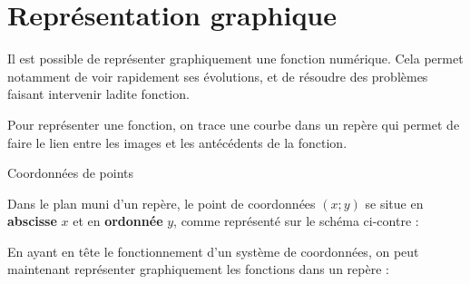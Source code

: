 \documentclass[oneside,12pt]{article}          %
\begin{document}
\section{Représentation graphique}

Il est possible de représenter graphiquement une fonction numérique. Cela permet notamment de voir rapidement ses évolutions, et de résoudre des problèmes faisant intervenir ladite fonction.

Pour représenter une fonction, on trace une courbe dans un repère qui permet de faire le lien entre les images et les antécédents de la fonction.


\begin{rappel}{Coordonnées de points}
	\begin{minipage}{0.6\linewidth}
		Dans le plan muni d'un repère, le point de coordonnées $(x;y)$ se situe en \textbf{abscisse} $x$ et en \textbf{ordonnée} $y$, comme représenté sur le schéma ci-contre :
	\end{minipage} \hspace{3mm}
	\begin{minipage}{0.4\linewidth}
	\end{minipage}
\end{rappel}


En ayant en tête le fonctionnement d'un système de coordonnées, on peut maintenant représenter graphiquement les fonctions dans un repère :
\end{document}
